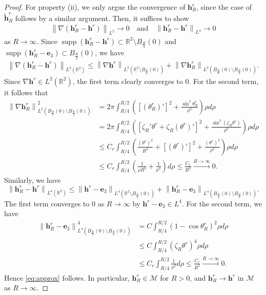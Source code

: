\documentclass{amsart}
\numberwithin{equation}{section}
\theoremstyle{definition}
\theoremstyle{remark}
\newcommand{\R}{\mathbb{R}}
\DeclareMathOperator{\supp}{supp}
\newcommand{\boM}{\mathcal{M}}
\newcommand{\te}{\ensuremath{\theta}}
\newcommand{\nor}[2]{\left\| {#1} \right\|_{#2}}		%
\newcommand{\nab}{{\nabla}}							%
\newcommand{\bh}{{\mathbf{h}}}
\newcommand{\bom}{{\mathbf{m}}}
\newcommand{\boe}{{\mathbf{e}}}
\begin{document}
\begin{proof}
For property (ii), we only argue the convergence of $\bh^r_R$, since the case of $\tilde\bh^r_R$ follows by a similar argument.
Then, it suffices to show
\begin{align}\label{eq:approx}
\nor{\nab( \bh^{r}_R -\bh^r) }{L^2}\to 0 \quad \text{and} \quad 
\nor{\bh^r_R - \bh^r}{L^4}\to 0
\end{align}
as $R\to\infty$. 
Since $\supp (\bh^r_R -\bh^r) \subset \R^2\setminus B_{\frac R4}(0)$ and $\supp (\bh^r_R-\boe_3) \subset B_{\frac R2}(0)$, we have
\begin{align*}
\nor{\nab (\bh^r_R -\bh^r)}{L^2(\R^2)}
\le \nor{\nab\bh^r}{L^2(\R^2\setminus B_{\frac R4}(0))} 
+ \nor{\nab\bh^r_R}{L^2(B_{\frac R2}(0)\setminus B_{\frac R4}(0))}.
\end{align*}
Since $\nab\bh^r\in L^2(\R^2)$, the first term clearly converges to $0$. 
For the second term, 
it follows that
\begin{align*}
\nor{\nab\bh^r_R}{L^2(B_{\frac R2}(0)\setminus B_{\frac R4}(0))}^2 
&= 2\pi \int_{R/4}^{R/2} 
\left([(\te^r_R)']^2 + \frac{\sin^2 \te^r_R}{\rho^2}\right) \rho d\rho \\
&= 2\pi \int_{R/4}^{R/2} 
\left([\zeta_R' \te^r + \zeta_R (\te^r)']^2 + \frac{\sin^2 (\zeta_R \te^r)}{\rho^2}\right) \rho d\rho\\
&\le 
C_r \int_{R/4}^{R/2} 
\left( \frac{(\te^r)^2}{R^2} +  
[(\te^r)']^2 + \frac{(\te^r)^2}{\rho^2}\right) \rho d\rho\\
&\le 
C_r \int_{R/4}^{R/2} 
\left( \frac{1}{\rho R^2} +  
\frac{1}{\rho^3}\right)  d\rho
\le \frac{C_r}{R^2} \xrightarrow{R\to\infty} 0.
\end{align*}
Similarly, we have
$$
\nor{\bh^r_R-\bh^r}{L^4(\R^2)}
\le \nor{\bh^r-\boe_3}{L^4(\R^2\setminus B_{\frac R4}(0))}+ \nor{\bh^r_R -\boe_3}{L^4(B_{\frac R2}(0)\setminus B_{\frac R4}(0))} .
$$
The first term converges to $0$ as $R\to\infty$ by $\bh^r -\boe_3\in L^4$. 
For the second term, we have
\begin{align*}
\nor{\bh^r_R -\boe_3}{L^4(B_{\frac R2}(0)\setminus B_{\frac R4}(0))}^4 
&= C \int_{R/4}^{R/2} (1- \cos \te^r_R)^2 \rho d\rho \\
&\le C \int_{R/4}^{R/2} (\zeta_R\te^r)^4 \rho d\rho \\
&\le C_r \int_{R/4}^{R/2} \frac{1}{\rho^3} d\rho 
\le \frac{C_r}{R^2} \xrightarrow{R\to\infty} 0. 
\end{align*}
Hence \eqref{eq:approx} follows. 
In particular, $\bh^r_R\in \boM$ for $R>0$, and $\bh^r_R\to \bh^r$ in $\boM$ as $R\to\infty$.


\end{proof}
\end{document}
